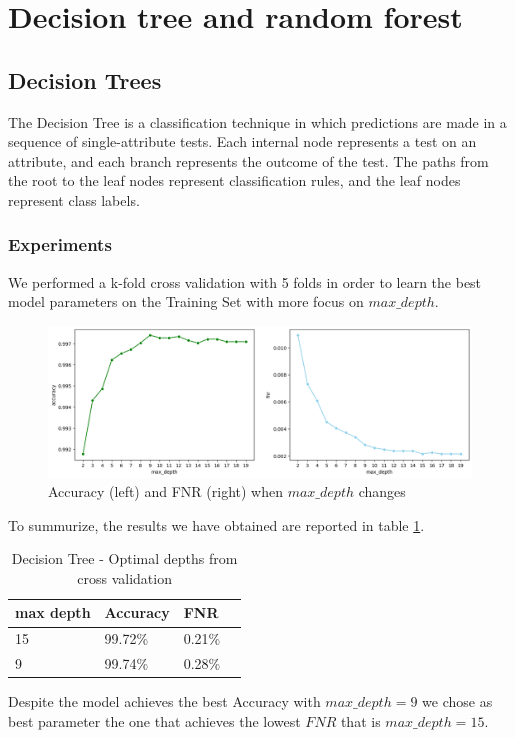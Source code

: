 \documentclass[twocolumn, switch]{article} %
\newcommand\x{0.7}
\begin{document}
\section{Decision tree and random forest}
\label{sec:tree}
\subsection{Decision Trees}
The Decision Tree is a classification technique in which predictions are made in a sequence of single-attribute tests.
Each internal node represents a test on an attribute, and each branch represents the outcome of the test. The paths from the root to the leaf nodes represent classification rules, and the leaf nodes represent class labels.
\subsubsection{Experiments}
\label{sub:tree}
We performed a k-fold cross validation with 5 folds in order to learn the best model parameters on the Training Set with more focus on $max\_depth$.
\begin{figure}[ht!]
	\centering
	\includegraphics[width=\x\linewidth]{tree_accuracy_fnr.png}
	\caption{Accuracy (left) and FNR (right) when $max\_depth$ changes}
	\label{fig:treetrain}
\end{figure}
To summurize, the results we have obtained are reported in table \ref{tab:treetrain}.
\begin{table}[ht!]
	\centering
	{\small
		\begin{tabular}{|l|l|l|l|}
			\hline
			\textbf{max depth} & \textbf{Accuracy} & \textbf{FNR} \\ \hline
			15                 & 99.72\%           & 0.21\%       \\ \hline
			9                  & 99.74\%           & 0.28\%       \\ \hline
		\end{tabular}
		\caption{Decision Tree - Optimal depths from cross validation}
		\label{tab:treetrain}
		\vspace{-5mm}
	}
\end{table}
Despite the model achieves the best Accuracy with $max\_depth = 9$ we chose as best parameter the one that achieves the lowest $FNR$ that is $max\_depth = 15$.
\end{document}
